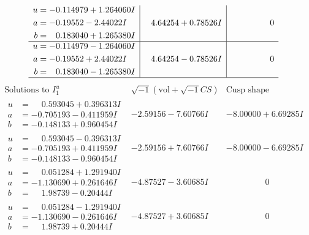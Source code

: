 \documentclass[1p]{elsarticle_modified}
\theoremstyle{definition}
\newcommand{\I}{\sqrt{-1}}
\begin{document}
$$\begin{array}{c|c|c}
\begin{aligned}
u &= -0.114979 + 1.264060 I \\
a &= -0.19552 - 2.44022 I \\
b &= \phantom{-}0.183040 + 1.265380 I\end{aligned}
 & \phantom{-}4.64254 + 0.78526 I & \phantom{-0.000000 } 0 \\ \hline\begin{aligned}
u &= -0.114979 - 1.264060 I \\
a &= -0.19552 + 2.44022 I \\
b &= \phantom{-}0.183040 - 1.265380 I\end{aligned}
 & \phantom{-}4.64254 - 0.78526 I & \phantom{-0.000000 } 0\\
 \hline 
 \end{array}$$\newpage$$\begin{array}{c|c|c}  
\text{Solutions to }I^u_{1}& \I (\text{vol} + \sqrt{-1}CS) & \text{Cusp shape}\\
 \hline 
\begin{aligned}
u &= \phantom{-}0.593045 + 0.396313 I \\
a &= -0.705193 - 0.411959 I \\
b &= -0.148133 + 0.960454 I\end{aligned}
 & -2.59156 - 7.60766 I & -8.00000 + 6.69285 I \\ \hline\begin{aligned}
u &= \phantom{-}0.593045 - 0.396313 I \\
a &= -0.705193 + 0.411959 I \\
b &= -0.148133 - 0.960454 I\end{aligned}
 & -2.59156 + 7.60766 I & -8.00000 - 6.69285 I \\ \hline\begin{aligned}
u &= \phantom{-}0.051284 + 1.291940 I \\
a &= -1.130690 + 0.261646 I \\
b &= \phantom{-}1.98739 - 0.20444 I\end{aligned}
 & -4.87527 - 3.60685 I & \phantom{-0.000000 } 0 \\ \hline\begin{aligned}
u &= \phantom{-}0.051284 - 1.291940 I \\
a &= -1.130690 - 0.261646 I \\
b &= \phantom{-}1.98739 + 0.20444 I\end{aligned}
 & -4.87527 + 3.60685 I & \phantom{-0.000000 } 0 \\ \hline\begin{aligned}

\end{aligned}
\end{array}$$
\end{document}
